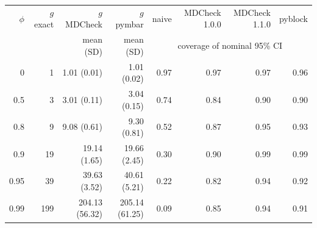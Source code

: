 \begin{tabular}{rrrrrrrr}
\toprule
$\phi$ & $g$ exact & $g$ MDCheck & $g$ pymbar & naive & MDCheck 1.0.0 & MDCheck 1.1.0 & pyblock \\
 & & mean (SD) & mean (SD) & \multicolumn{4}{c}{coverage of nominal 95\% CI} \\
\midrule
0 & 1 & 1.01 (0.01) & 1.01 (0.02) & 0.97 & 0.97 & 0.97 & 0.96 \\
0.5 & 3 & 3.01 (0.11) & 3.04 (0.15) & 0.74 & 0.84 & 0.90 & 0.90 \\
0.8 & 9 & 9.08 (0.61) & 9.30 (0.81) & 0.52 & 0.87 & 0.95 & 0.93 \\
0.9 & 19 & 19.14 (1.65) & 19.66 (2.45) & 0.30 & 0.90 & 0.99 & 0.99 \\
0.95 & 39 & 39.63 (3.52) & 40.61 (5.21) & 0.22 & 0.82 & 0.94 & 0.92 \\
0.99 & 199 & 204.13 (56.32) & 205.14 (61.25) & 0.09 & 0.85 & 0.94 & 0.91 \\
\bottomrule
\end{tabular}
